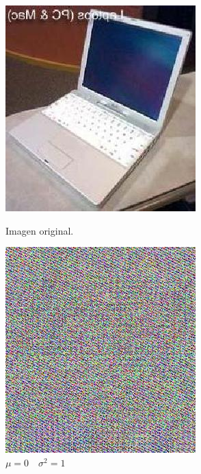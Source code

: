 \documentclass[11pt,spanish]{article}
\begin{document}
\begin{figure}[htbp]
	\centering
	\begin{minipage}[b]{0.35\textwidth}
		\includegraphics[width=\textwidth]{../image.jpg}
		\caption{Imagen original.}
		\label{img_original}
	\end{minipage}
	\hfill
	\begin{minipage}[b]{0.35\textwidth}
		\includegraphics[width=\textwidth]{../normalized_image.jpg}
		\caption{$\mu=0 \quad \sigma^2=1$}
		\label{img_cuantizada}
	\end{minipage}
\end{figure}
\end{document}
